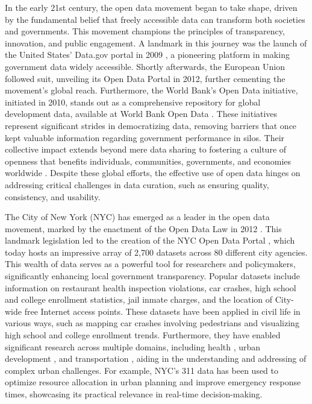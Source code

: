 \documentclass[linenumber]{jdsart}
\begin{document}
In the early 21st century, the open data movement began 
to take shape, driven by the fundamental belief that 
freely accessible data can transform both societies and 
governments. This movement champions the principles
of transparency, innovation, and public engagement. 
A landmark in this journey was the launch of the United States'
Data.gov portal in 2009 \citep{dataGov}, a pioneering
platform in making government data widely accessible. Shortly afterwards,
the European Union followed suit, unveiling its Open Data Portal 
\citep{dataEU} in 2012, further cementing the movement's 
global reach. Furthermore, the World Bank's Open
Data initiative, initiated in 2010, stands out as a comprehensive
repository for global development data, available at
World Bank Open Data \citep{dataWorldBank}. 
These initiatives represent significant strides in democratizing data, 
removing barriers that once kept valuable information 
regarding government performance in silos. Their collective impact 
extends beyond mere data sharing to fostering a culture of openness 
that benefits individuals, communities, governments, and economies worldwide 
\citep{barns2016mine, wang2016adoption}.
Despite these global efforts, the effective use of open data hinges on
addressing critical challenges in data curation, such as ensuring
quality, consistency, and usability.


The City of New York (NYC) has emerged as a leader in the open data movement,
marked by the enactment of the Open Data Law in 2012
\citep{zuiderwijk2014open}. This landmark legislation led to the
creation of the NYC Open Data Portal \citep{dataNYC}, which 
today hosts an impressive array of 2,700 datasets
across 80 different city agencies. This wealth of data serves as a
powerful tool for researchers and policymakers, significantly
enhancing local government transparency.
Popular datasets include information on
restaurant health inspection violations, car crashes, high school and
college enrollment statistics, jail inmate charges, and the location
of City-wide free Internet access points. These datasets have been
applied in civil life in various ways, such as mapping car crashes
involving pedestrians and visualizing high school and college
enrollment trends. Furthermore, they have enabled significant research
across multiple domains, including health \citep{cantor2018facets, 
shankar2021data}, urban development \citep{neves2020impacts}, and
transportation \citep{gerte2019understanding}, aiding in the
understanding and addressing of complex urban challenges.
For example, NYC’s 311 data has been used to optimize resource
allocation in urban planning and improve emergency response times,
showcasing its practical relevance in real-time decision-making.
\end{document}
